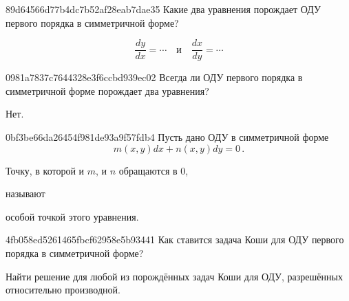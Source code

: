\begin{note}{89d64566d77b4dc7b52af28eab7dae35}
    Какие два уравнения порождает ОДУ первого порядка в симметричной форме?

    \begin{cloze}{1}
        \[
            \frac{dy}{dx} = \cdots \quad \text{и} \quad \frac{dx}{dy} = \cdots
        \]
    \end{cloze}
\end{note}

\begin{note}{0981a7837c7644328e3f6ccbd939ec02}
    Всегда ли ОДУ первого порядка в симметричной форме порождает два уравнения?

    \begin{cloze}{1}
        Нет.
    \end{cloze}
\end{note}

\begin{note}{0bf3be66da26454f981de93a9f57fdb4}
    Пусть дано ОДУ в симметричной форме
    \[
        m(x, y) dx + n(x, y) dy = 0\,.
    \]
    \begin{icloze}{2}Точку, в которой и \({ m }\), и \({ n }\) обращаются в \({ 0 }\),\end{icloze} называют \begin{icloze}{1}особой точкой этого уравнения.\end{icloze}
\end{note}

\begin{note}{4fb058ed5261465fbcf62958e5b93441}
    Как ставится задача Коши для ОДУ первого порядка в симметричной форме?

    \begin{cloze}{1}
        Найти решение для любой из порождённых задач Коши для ОДУ, разрешённых относительно производной.
    \end{cloze}
\end{note}


